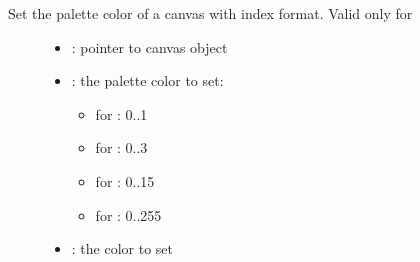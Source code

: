 \documentclass[letterpaper,10pt,english]{sphinxmanual}
\begin{document}
\begin{fulllineitems}
\label{\detokenize{object-types/canvas:_CPPv421lv_canvas_set_paletteP8lv_obj_t7uint8_t10lv_color_t}}%
\pysigstartmultiline
{}\label{\detokenize{object-types/canvas:lv__canvas_8h_1a3a4b96429bd0b14aa00cee3dacb45a02}}%
\pysigstopmultiline
Set the palette color of a canvas with index format. Valid only for  \begin{description}
\item[{}] \leavevmode\begin{itemize}
\item {} 
: pointer to canvas object 

\item {} 
: the palette color to set:\begin{itemize}
\item {} 
for : 0..1

\item {} 
for : 0..3

\item {} 
for : 0..15

\item {} 
for : 0..255 

\end{itemize}


\item {} 
: the color to set 

\end{itemize}

\end{description}


\end{fulllineitems}

\end{document}
